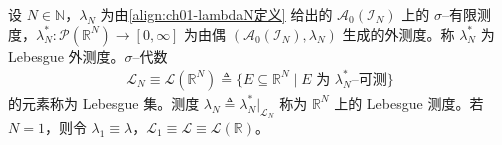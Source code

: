 \documentclass[../../main.tex]{subfiles}%
\begin{document}
\begin{definition}\label{definition:ch01-Lebesgue测度}
设 $N\in\mathbb{N}$，$\lambda_N$ 为由\eqref{align:ch01-lambdaN定义} 给出的 $\mathcal{A}_0(\mathcal{I}_N)$ 上的 $\sigma$--有限测度，$\lambda_N^*:\mathcal{P}(\mathbb{R}^N)\to[0,\infty]$ 为由偶 $(\mathcal{A}_0(\mathcal{I}_N),\lambda_N)$ 生成的外测度。称 $\lambda_N^*$ 为 Lebesgue 外测度。$\sigma$--代数
\begin{align*}
\mathcal{L}_N\equiv\mathcal{L}(\mathbb{R}^N)\triangleq\{E\subseteq\mathbb{R}^N\mid E\text{ 为 }\lambda_N^*\text{--可测}\}
\end{align*}
的元素称为 Lebesgue 集。测度 $\lambda_N\triangleq\lambda_N^*|_{\mathcal{L}_N}$ 称为 $\mathbb{R}^N$ 上的 Lebesgue 测度。若 $N=1$，则令 $\lambda_1\equiv\lambda$，$\mathcal{L}_1\equiv\mathcal{L}\equiv\mathcal{L}(\mathbb{R})$。
\end{definition}
\end{document}

